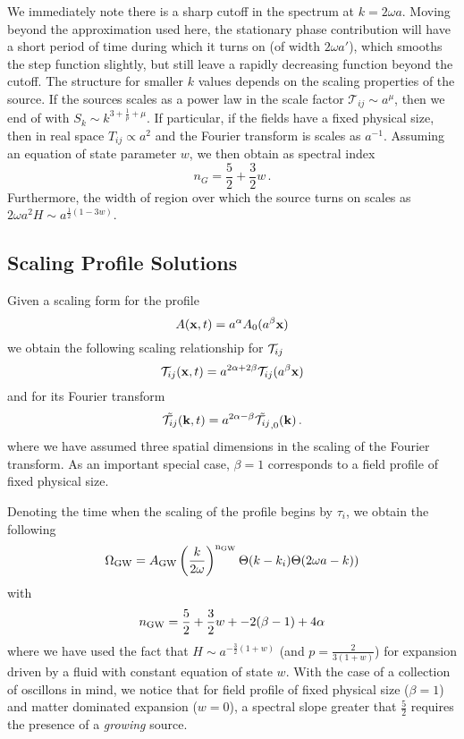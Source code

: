 \documentclass{revtex4}
\begin{document}
We immediately note there is a sharp cutoff in the spectrum at $k = 2\omega a$.
Moving beyond the approximation used here, the stationary phase contribution will have a short period of time during which it turns on (of width $2\omega a'$), which smooths the step function slightly, but still leave a rapidly decreasing function beyond the cutoff.
The structure for smaller $k$ values depends on the scaling properties of the source.
If the sources scales as a power law in the scale factor $\mathcal{T}_{ij} \sim a^\mu$, then we end of with $S_k \sim k^{3+\frac{1}{p}+\mu}$.
If particular, if the fields have a fixed physical size, then in real space $T_{ij} \propto a^2$ and the Fourier transform is scales as $a^{-1}$.
Assuming an equation of state parameter $w$, we then obtain as spectral index
\begin{equation}
  n_G = \frac{5}{2} + \frac{3}{2}w \, .
\end{equation}
Furthermore, the width of region over which the source turns on scales as $2\omega a^2H \sim a^{\frac{1}{2}\left(1-3w\right)}$.

\subsection{Scaling Profile Solutions}
Given a scaling form for the profile
\begin{equation}
  A({\bf x},t) = a^\alpha A_0(a^\beta{\bf x})
\end{equation}
we obtain the following scaling relationship for $\mathcal{T}_{ij}$
\begin{equation}
  \mathcal{T}_{ij}({\bf x},t) = a^{2\alpha+2\beta}\mathcal{T}_{ij}(a^\beta{\bf x})
\end{equation}
and for its Fourier transform
\begin{equation}
  \tilde{\mathcal{T}_{ij}}({\bf k},t) = a^{2\alpha-\beta}\tilde{\mathcal{T}_{ij}}_{,0}({\bf k}) \, .
\end{equation}
where we have assumed three spatial dimensions in the scaling of the Fourier transform.
As an important special case, $\beta=1$ corresponds to a field profile of fixed physical size.

Denoting the time when the scaling of the profile begins by $\tau_i$, we obtain the following
\begin{equation}
  \Omega_{\rm GW} = A_{\rm GW}\left(\frac{k}{2\omega}\right)^{\rm n_{\rm GW}}\Theta(k-k_i)\Theta(2\omega a - k))
\end{equation}
with
\begin{equation}
  n_{\rm GW} = \frac{5}{2} + \frac{3}{2}w + - 2(\beta-1) + 4\alpha
\end{equation}
where we have used the fact that $H \sim a^{-\frac{3}{2}(1+w)}$ (and $p = \frac{2}{3(1+w)}$) for expansion driven by a fluid with constant equation of state $w$.
With the case of a collection of oscillons in mind, we notice that for field profile of fixed physical size ($\beta=1$) and matter dominated expansion ($w=0$), a spectral slope greater that $\frac{5}{2}$ requires the presence of a \emph{growing} source.
\end{document}
